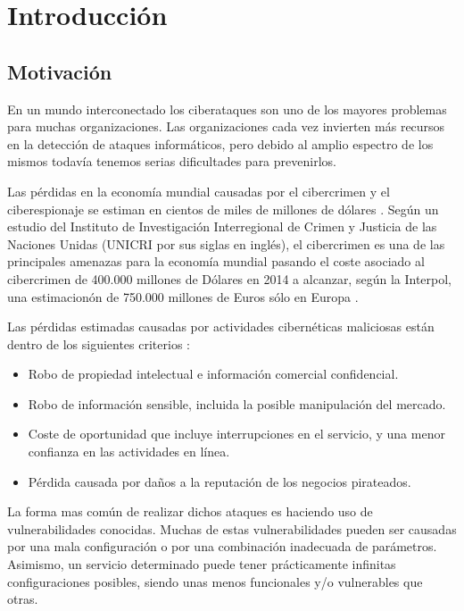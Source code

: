 \chapter{Introducción}

\section{Motivación}

En un mundo interconectado los ciberataques son uno de los mayores problemas para muchas organizaciones. Las organizaciones cada vez invierten más recursos en la detección de ataques informáticos, pero debido al amplio espectro de los mismos todavía tenemos serias dificultades para prevenirlos.

\bigskip
Las pérdidas en la economía mundial causadas por el cibercrimen y el ciberespionaje se estiman en cientos de miles de millones de dólares \cite{herrero_cibercrimen_2015}. Según un estudio del Instituto de Investigación Interregional de Crimen y Justicia de las Naciones Unidas (UNICRI por sus siglas en inglés), el cibercrimen es una de las principales amenazas para la economía mundial pasando el coste asociado al cibercrimen de 400.000 millones de Dólares en 2014 \cite{zappa_cybercrime:_2014} a alcanzar, según la Interpol, una estimacionón de 750.000 millones de Euros sólo en Europa \cite{gil_cuanto_2018}.

\bigskip
Las pérdidas estimadas causadas por actividades cibernéticas maliciosas están dentro de los siguientes criterios \cite{armin_2020_2015}:

\begin{itemize}
  \item Robo de propiedad intelectual e información comercial confidencial.
  \item Robo de información sensible, incluida la posible manipulación del mercado.
  \item Coste de oportunidad que incluye interrupciones en el servicio, y una menor confianza en las actividades en línea.
  \item Pérdida causada por daños a la reputación de los negocios pirateados.
\end{itemize}

\bigskip
La forma mas común de realizar dichos ataques es haciendo uso de vulnerabilidades conocidas. Muchas de estas vulnerabilidades pueden ser causadas por una mala configuración o por una combinación inadecuada de parámetros. Asimismo, un servicio determinado puede tener prácticamente infinitas configuraciones posibles, siendo unas menos funcionales y/o vulnerables que otras.

